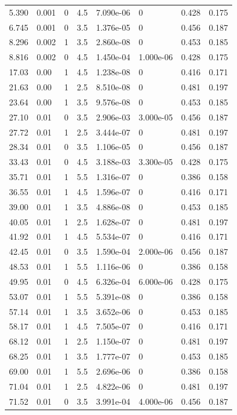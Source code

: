 \documentclass[preview]{standalone}
\begin{document}
{{\begin{tabular}{L{1.2cm}C{1.2cm} C{0.3cm}C{0.5cm} C{1.4cm}C{1.4cm} C{1.4cm}C{1.4cm}}
  5.390  &  0.001  & 0     & 4.5 &  7.090e-06  & 0  & 0.428 &  0.175   \\ 
  6.745  &  0.001  & 0     & 3.5 &  1.376e-05  & 0  & 0.456 &  0.187   \\ 
  8.296  &  0.002  & 1     & 3.5 &  2.860e-08  & 0  & 0.453 &  0.185   \\ 
  8.816  &  0.002  & 0     & 4.5 &  1.450e-04  & 1.000e-06  & 0.428 &  0.175   \\ 
  17.03  &  0.00  & 1     & 4.5 &  1.238e-08  & 0  & 0.416 &  0.171   \\ 
  21.63  &  0.00  & 1     & 2.5 &  8.510e-08  & 0  & 0.481 &  0.197   \\ 
  23.64  &  0.00  & 1     & 3.5 &  9.576e-08  & 0  & 0.453 &  0.185   \\ 
  27.10  &  0.01  & 0     & 3.5 &  2.906e-03  & 3.000e-05  & 0.456 &  0.187   \\ 
  27.72  &  0.01  & 1     & 2.5 &  3.444e-07  & 0  & 0.481 &  0.197   \\ 
  28.34  &  0.01  & 0     & 3.5 &  1.106e-05  & 0  & 0.456 &  0.187   \\ 
  33.43  &  0.01  & 0     & 4.5 &  3.188e-03  & 3.300e-05  & 0.428 &  0.175   \\ 
  35.71  &  0.01  & 1     & 5.5 &  1.316e-07  & 0  & 0.386 &  0.158   \\ 
  36.55  &  0.01  & 1     & 4.5 &  1.596e-07  & 0  & 0.416 &  0.171   \\ 
  39.00  &  0.01  & 1     & 3.5 &  4.886e-08  & 0  & 0.453 &  0.185   \\ 
  40.05  &  0.01  & 1     & 2.5 &  1.628e-07  & 0  & 0.481 &  0.197   \\ 
  41.92  &  0.01  & 1     & 4.5 &  5.534e-07  & 0  & 0.416 &  0.171   \\ 
  42.45  &  0.01  & 0     & 3.5 &  1.590e-04  & 2.000e-06  & 0.456 &  0.187   \\ 
  48.53  &  0.01  & 1     & 5.5 &  1.116e-06  & 0  & 0.386 &  0.158   \\ 
  49.95  &  0.01  & 0     & 4.5 &  6.326e-04  & 6.000e-06  & 0.428 &  0.175   \\ 
  53.07  &  0.01  & 1     & 5.5 &  5.391e-08  & 0  & 0.386 &  0.158   \\ 
  57.14  &  0.01  & 1     & 3.5 &  3.652e-06  & 0  & 0.453 &  0.185   \\ 
  58.17  &  0.01  & 1     & 4.5 &  7.505e-07  & 0  & 0.416 &  0.171   \\ 
  68.12  &  0.01  & 1     & 2.5 &  1.150e-07  & 0  & 0.481 &  0.197   \\ 
  68.25  &  0.01  & 1     & 3.5 &  1.777e-07  & 0  & 0.453 &  0.185   \\ 
  69.00  &  0.01  & 1     & 5.5 &  2.696e-06  & 0  & 0.386 &  0.158   \\ 
  71.04  &  0.01  & 1     & 2.5 &  4.822e-06  & 0  & 0.481 &  0.197   \\ 
  71.52  &  0.01  & 0     & 3.5 &  3.991e-04  & 4.000e-06  & 0.456 &  0.187   \\ 
\hline 
\end{tabular} 

}}
\end{document}
